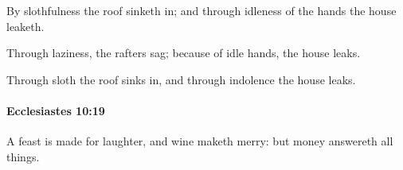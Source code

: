 			\begin{versebox}
					\item[BHS] 
					\item[LXX] 
					\item[ASV] By slothfulness the roof sinketh in; and through idleness of the hands the house leaketh.
					\item[NIV] Through laziness, the rafters sag; because of idle hands, the house leaks.
					\item[NRSV] Through sloth the roof sinks in, and through indolence the house leaks.
			\end{versebox}

		\paragraph{Ecclesiastes 10:19} %
			\label{ECCLESIASTES-10-19}

			A feast is made for laughter, and wine maketh merry: but money answereth all things.

